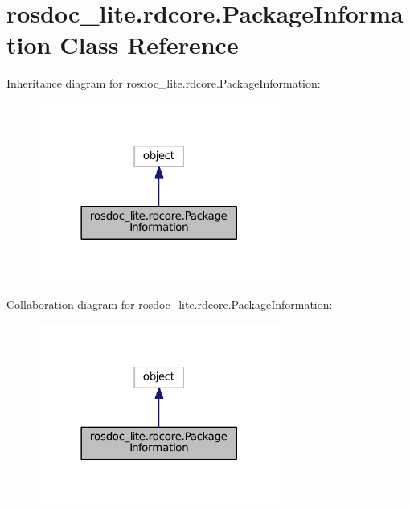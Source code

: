 \hypertarget{classrosdoc__lite_1_1rdcore_1_1PackageInformation}{}\section{rosdoc\+\_\+lite.\+rdcore.\+Package\+Information Class Reference}
\label{classrosdoc__lite_1_1rdcore_1_1PackageInformation}


Inheritance diagram for rosdoc\+\_\+lite.\+rdcore.\+Package\+Information\+:
\nopagebreak
\begin{figure}[H]
\begin{center}
\leavevmode
\includegraphics[width=225pt]{classrosdoc__lite_1_1rdcore_1_1PackageInformation__inherit__graph}
\end{center}
\end{figure}


Collaboration diagram for rosdoc\+\_\+lite.\+rdcore.\+Package\+Information\+:
\nopagebreak
\begin{figure}[H]
\begin{center}
\leavevmode
\includegraphics[width=225pt]{classrosdoc__lite_1_1rdcore_1_1PackageInformation__coll__graph}
\end{center}
\end{figure}
